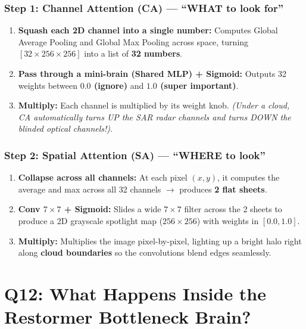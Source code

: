 \documentclass[11pt,a4paper]{article}
\begin{document}
\subsubsection*{Step 1: Channel Attention (CA) --- ``WHAT to look for''}
\begin{enumerate}[leftmargin=1.5em]
    \item \textbf{Squash each 2D channel into a single number:} Computes Global Average Pooling and Global Max Pooling across space, turning $[32 \times 256 \times 256]$ into a list of \textbf{32 numbers}.
    \item \textbf{Pass through a mini-brain (Shared MLP) + Sigmoid:} Outputs 32 weights between \textbf{$0.0$ (ignore)} and \textbf{$1.0$ (super important)}.
    \item \textbf{Multiply:} Each channel is multiplied by its weight knob. \textit{(Under a cloud, CA automatically turns UP the SAR radar channels and turns DOWN the blinded optical channels!)}.
\end{enumerate}

\subsubsection*{Step 2: Spatial Attention (SA) --- ``WHERE to look''}
\begin{enumerate}[leftmargin=1.5em]
    \item \textbf{Collapse across all channels:} At each pixel $(x, y)$, it computes the average and max across all 32 channels $\to$ produces \textbf{2 flat sheets}.
    \item \textbf{Conv $7\times 7$ + Sigmoid:} Slides a wide $7\times 7$ filter across the 2 sheets to produce a 2D grayscale spotlight map ($256 \times 256$) with weights in $[0.0, 1.0]$.
    \item \textbf{Multiply:} Multiplies the image pixel-by-pixel, lighting up a bright halo right along \textbf{cloud boundaries} so the convolutions blend edges seamlessly.
\end{enumerate}

\bigskip

\section{Q12: What Happens Inside the Restormer Bottleneck Brain?}
\end{document}
